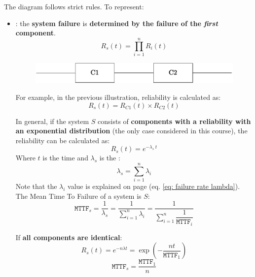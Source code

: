 \highspace
The diagram follows strict rules. To represent:
\begin{itemize}
    \item {}: the \textbf{system failure} is \textbf{determined by the failure of the \emph{first} component}.
    \begin{equation}
        R_{s}\left(t\right) = \prod_{i=1}^{n} R_{i}\left(t\right)
    \end{equation}
    \begin{figure}[!htp]
        \centering
        \includegraphics[width=.8\textwidth]{img/RBD-1.pdf}
    \end{figure}

    For example, in the previous illustration, reliability is calculated as:
    \begin{equation*}
        R_{s}\left(t\right) = R_{C1}\left(t\right) \times R_{C2}\left(t\right)
    \end{equation*}

    In general, if the system $S$ consists of \textbf{components with a reliability with an exponential distribution} (the only case considered in this course), the reliability can be calculated as:
    \begin{equation}
        R_{s}\left(t\right) = e^{-\lambda_{s} \: t}
    \end{equation}
    Where $t$ is the time and $\lambda_{s}$ is the :
    \begin{equation}
        \lambda_{s} = \displaystyle\sum_{i=1}^{n}\lambda_{i}
    \end{equation}
    Note that the $\lambda_{i}$ value is explained on page \pageref{eq: failure rate lambda} (eq. \ref{eq: failure rate lambda}). The Mean Time To Failure of a system is $S$:
    \begin{equation}
        \texttt{MTTF}_{s} = \dfrac{1}{\lambda_{s}} = \dfrac{1}{\displaystyle\sum_{i=1}^{n}\lambda_{i}} = \dfrac{1}{
            \displaystyle\sum_{i=1}^{n} \dfrac{1}{\texttt{MTTF}_{i}}
        }
    \end{equation}

    If \textbf{all components are identical}:
    \begin{equation}
        R_{s}\left(t\right) = e^{- n \lambda t} = \exp\left(- \dfrac{n t}{\texttt{MTTF}_{1}}\right)
    \end{equation}
    \begin{equation}
        \texttt{MTTF}_{s} = \dfrac{\texttt{MTTF}_{1}}{n}
    \end{equation}


\end{itemize}

